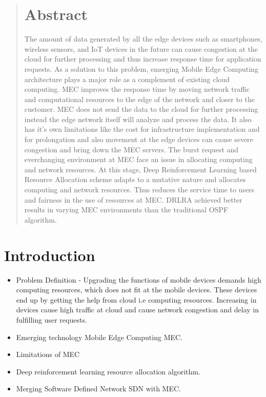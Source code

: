 \begin{abstract}
\section*{Abstract}
The amount of data generated by all the edge devices such as smartphones, wireless sensors, and IoT devices in the future can cause congestion at the cloud for further processing and thus increase response time for application requests. As a solution to this problem, emerging  Mobile Edge Computing architecture plays a major role as a complement of existing cloud computing. MEC improves the response time by moving network traffic and computational resources to the edge of the network and closer to the customer. MEC does not send the data to the cloud for further processing instead the edge network itself will analyze and process the data. It also has it's own limitations like the cost for infrastructure implementation and for prolongation and also movement at the edge devices can cause severe congestion and bring down the MEC servers. The burst request and everchanging environment at MEC face an issue in allocating computing and network resources. At this stage, Deep Reinforcement Learning based Resource Allocation scheme adapts to a mutative nature and allocates computing and network resources. Thus reduces the service time to users and fairness in the use of resources at MEC. DRLRA achieved better results in varying MEC environments than the traditional OSPF algorithm. 
\end{abstract}


\setlength{\parindent}{1em}
\setlength{\parskip}{0.1em}
\section{Introduction}
\label{sec:introduction}
\begin{itemize}
    \item Problem Definition - Upgrading the functions of mobile devices demands high computing resources, which does not fit at the mobile devices. These devices end up by getting the help from cloud i.e computing resources. Increasing in devices cause high traffic at cloud and cause network congestion and delay in fulfilling user requests.\cite{Sun2016:_MECIoT} \cite{Jia2019:_MEC}\cite{Wen2017:_IV}\cite{Kuljeet2018:_IIoT}
    \item Emerging technology Mobile Edge Computing MEC.
    \item Limitations of MEC
    \item Deep reinforcement learning resource allocation algorithm.\cite{Wiki:_RL}
    \item Merging Software Defined Network SDN \cite{soft:_SDN} with MEC.
\end{itemize}


